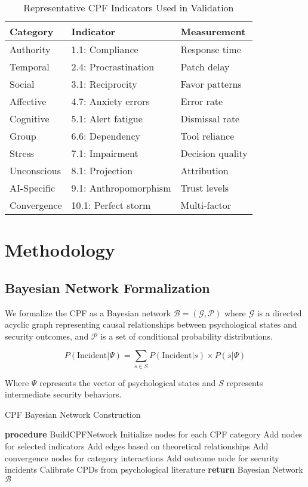 \documentclass[10pt,twocolumn]{IEEEtran}
\begin{document}
\begin{table}[h]
\caption{Representative CPF Indicators Used in Validation}
\label{tab:indicators}
\centering
\begin{tabular}{@{}lll@{}}
\toprule
Category & Indicator & Measurement \\
\midrule
Authority & 1.1: Compliance & Response time \\
Temporal & 2.4: Procrastination & Patch delay \\
Social & 3.1: Reciprocity & Favor patterns \\
Affective & 4.7: Anxiety errors & Error rate \\
Cognitive & 5.1: Alert fatigue & Dismissal rate \\
Group & 6.6: Dependency & Tool reliance \\
Stress & 7.1: Impairment & Decision quality \\
Unconscious & 8.1: Projection & Attribution \\
AI-Specific & 9.1: Anthropomorphism & Trust levels \\
Convergence & 10.1: Perfect storm & Multi-factor \\
\bottomrule
\end{tabular}
\end{table}

\section{Methodology}

\subsection{Bayesian Network Formalization}

We formalize the CPF as a Bayesian network $\mathcal{B} = (\mathcal{G}, \mathcal{P})$ where $\mathcal{G}$ is a directed acyclic graph representing causal relationships between psychological states and security outcomes, and $\mathcal{P}$ is a set of conditional probability distributions.

\begin{equation}
P(\text{Incident} | \Psi) = \sum_{s \in S} P(\text{Incident} | s) \times P(s | \Psi)
\end{equation}

Where $\Psi$ represents the vector of psychological states and $S$ represents intermediate security behaviors.

\begin{algorithm}
\caption{CPF Bayesian Network Construction}
\label{alg:bayesian}
\begin{algorithmic}[1]
\STATE \textbf{procedure} BuildCPFNetwork
\STATE Initialize nodes for each CPF category
    \STATE Add nodes for selected indicators
    \STATE Add edges based on theoretical relationships
\ENDFOR
\STATE Add convergence nodes for category interactions
\STATE Add outcome node for security incidents
\STATE Calibrate CPDs from psychological literature
\STATE \textbf{return} Bayesian Network $\mathcal{B}$
\end{algorithmic}
\end{algorithm}
\end{document}

